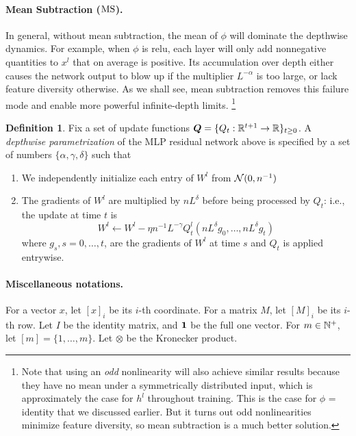 \documentclass{article}
\theoremstyle{plain}
\theoremstyle{definition}
\newtheorem{definition}[theorem]{Definition}
\begin{document}
\paragraph{Mean Subtraction ($\mathrm{MS}$).} 
In general, without mean subtraction, the mean of $\phi$ will dominate the depthwise dynamics. For example, when $\phi$ is relu, each layer will only add nonnegative quantities to $x^l$ that on average is positive. Its accumulation over depth either causes the network output to blow up if the multiplier $L^{-\alpha}$ is too large, or lack feature diversity otherwise.
As we shall see, mean subtraction removes this failure mode and enable more powerful infinite-depth limits.%
\footnote{Note that using an \emph{odd} nonlinearity will also achieve similar results because they have no mean under a symmetrically distributed input, which is approximately the case for $h^l$ throughout training. This is the case for $\phi$ = identity that we discussed earlier. But it turns out odd nonlinearities minimize feature diversity, so mean subtraction is a much better solution.}

\begin{definition}\label{defn:abcd}
  Fix a set of update functions $\boldsymbol{Q} = \{Q_t:\mathbb{R}^{t+1}\to\mathbb{R}\}_{t\ge0}$.
  A \emph{depthwise parametrization} of the MLP residual network above is specified by a set of numbers $\{\alpha, \gamma, \delta\}$
  such that
  \begin{enumerate}[label=(\alph*)]
  \item We independently initialize each entry of $W^{l}$ from $\mathcal{N}(0,n^{-1} )$
  \item The gradients of $W^{l}$ are multiplied by $n L^{\delta}$ before being
  processed by $Q_t$: i.e., the update at time $t$ is
  \begin{equation}
  W^{l}\gets W^{l}-\eta n^{-1} L^{-\gamma}Q^l_t(n L^{\delta} g_{0},\ldots,n L^{\delta} g_{t})
  \label{eqn:abcdupdate}
  \end{equation}
  where $g_{s},s=0,\ldots,t$, are the gradients of $W^{l}$ at time
  $s$ and $Q_t$ is applied entrywise.
  \end{enumerate}
\end{definition}

\paragraph{Miscellaneous notations.}  For a vector $x$, let $[x]_i$ be its $i$-th coordinate. For a matrix $M$, let $[M]_i$ be its $i$-th row. Let $I$ be the identity matrix, and ${\bm 1}$ be the full one vector. For $m\in \mathbb{N}^+$, let $[m] = \{1, \ldots, m\}$. Let $\otimes$ be the Kronecker product. 
 
\end{document}
